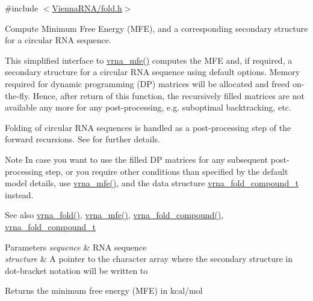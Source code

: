 {\ttfamily \#include $<$\mbox{\hyperlink{fold_8h}{Vienna\+R\+N\+A/fold.\+h}}$>$}



Compute Minimum Free Energy (M\+FE), and a corresponding secondary structure for a circular R\+NA sequence. 

This simplified interface to \mbox{\hyperlink{group__mfe__fold_gabd3b147371ccf25c577f88bbbaf159fd}{vrna\+\_\+mfe()}} computes the M\+FE and, if required, a secondary structure for a circular R\+NA sequence using default options. Memory required for dynamic programming (DP) matrices will be allocated and free\textquotesingle{}d on-\/the-\/fly. Hence, after return of this function, the recursively filled matrices are not available any more for any post-\/processing, e.\+g. suboptimal backtracking, etc.

Folding of circular R\+NA sequences is handled as a post-\/processing step of the forward recursions. See \cite{hofacker:2006} for further details.

\begin{DoxyNote}{Note}
In case you want to use the filled DP matrices for any subsequent post-\/processing step, or you require other conditions than specified by the default model details, use \mbox{\hyperlink{group__mfe__fold_gabd3b147371ccf25c577f88bbbaf159fd}{vrna\+\_\+mfe()}}, and the data structure \mbox{\hyperlink{group__fold__compound_ga1b0cef17fd40466cef5968eaeeff6166}{vrna\+\_\+fold\+\_\+compound\+\_\+t}} instead.
\end{DoxyNote}
\begin{DoxySeeAlso}{See also}
\mbox{\hyperlink{group__mfe__fold__single_ga29a33b2895f4e67b0480271ff289afdc}{vrna\+\_\+fold()}}, \mbox{\hyperlink{group__mfe__fold_gabd3b147371ccf25c577f88bbbaf159fd}{vrna\+\_\+mfe()}}, \mbox{\hyperlink{group__fold__compound_ga6601d994ba32b11511b36f68b08403be}{vrna\+\_\+fold\+\_\+compound()}}, \mbox{\hyperlink{group__fold__compound_ga1b0cef17fd40466cef5968eaeeff6166}{vrna\+\_\+fold\+\_\+compound\+\_\+t}}
\end{DoxySeeAlso}

\begin{DoxyParams}{Parameters}
{\em sequence} & R\+NA sequence \\
\hline
{\em structure} & A pointer to the character array where the secondary structure in dot-\/bracket notation will be written to \\
\hline
\end{DoxyParams}
\begin{DoxyReturn}{Returns}
the minimum free energy (M\+FE) in kcal/mol 
\end{DoxyReturn}
\mbox{\label{group__mfe__fold__single_ga2bc41df5d71fee6fd8da9904ee65d8fb}} 
